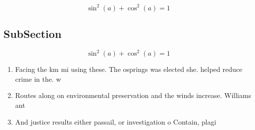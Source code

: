 \documentclass[a4paper]{article}
\begin{document}
\[ \sin^2(a)+\cos^2(a) = 1 \]

\subsection{SubSection}

\[ \sin^2(a)+\cos^2(a) = 1 \]

\begin{enumerate}
\item Facing the km mi using these. The osprings was elected she. helped reduce crime in the. w

\item Routes along on environmental preservation and the winds increase. Williams ant

\item And justice results either passail, or investigation o Contain, plagi

\end{enumerate}
\end{document}
